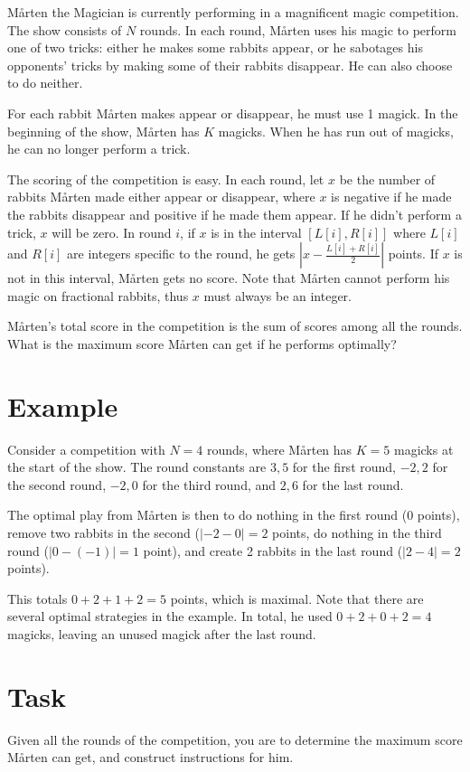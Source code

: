 \newcommand\version{v1}
Mårten the Magician is currently performing in a magnificent magic competition.
The show consists of $N$ rounds.
In each round, Mårten uses his magic to perform one of two tricks: either he makes
some rabbits appear, or he sabotages his opponents' tricks by making some of
their rabbits disappear. He can also choose to do neither.

For each rabbit Mårten makes appear or disappear, he must use 1 magick.
In the beginning of the show, Mårten has $K$ magicks. When he has run out
of magicks, he can no longer perform a trick.

The scoring of the competition is easy. In each round, let $x$ be the
number of rabbits Mårten made either appear or disappear, where $x$ is negative if he made
the rabbits disappear and positive if he made them appear. If he didn't perform a trick,
$x$ will be zero.
In round $i$, if $x$ is in the interval $[L[i], R[i]]$ where $L[i]$ and $R[i]$ are integers specific
to the round, he gets $|x - \frac{L[i] + R[i]}{2}|$ points. If $x$ is not in this interval,
Mårten gets no score. Note that Mårten cannot perform his magic on fractional rabbits,
thus $x$ must always be an integer.

Mårten's total score in the competition is the sum of scores among all the rounds.
What is the maximum score Mårten can get if he performs optimally?

\section*{Example}
Consider a competition with $N = 4$ rounds, where Mårten has $K = 5$ magicks at the start of the show.
The round constants are $3, 5$ for the first round, $-2, 2$ for the second round, $-2, 0$ for the third
round, and $2, 6$ for the last round.

The optimal play from Mårten is then to do nothing in the first round ($0$ points), remove two rabbits in the second ($|-2 - 0| = 2$ points, 
do nothing in the third round ($|0 - (-1)| = 1$ point), and create 2 rabbits in the last round ($|2 - 4| = 2$ points).

This totals $0 + 2 + 1 + 2 = 5$ points, which is maximal. Note that there are several optimal strategies in the example.
In total, he used $0 + 2 + 0 + 2 = 4$ magicks, leaving an unused magick after the last round.

\section*{Task}
Given all the rounds of the competition, you are to determine the maximum score Mårten can get,
and construct instructions for him.

